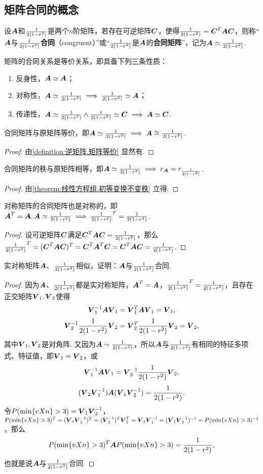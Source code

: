 \subsection{矩阵合同的概念}
\begin{definition}
设\(\A\)和\(\B\)是两个\(n\)阶矩阵，若存在可逆矩阵\(\C\)，使得\(\B=\C^T\A\C\)，则称“\(\A\)与\(\B\)\textbf{合同}（congruent）”或“\(\B\)是\(\A\)的\textbf{合同矩阵}”，记为\(\A\simeq\B\).
\end{definition}

\begin{property}
矩阵的合同关系是等价关系，即具备下列三条性质：
\begin{enumerate}
\item 反身性，\(\A\simeq\A\)；
\item 对称性，\(\A\simeq\B \implies \B\simeq\A\)；
\item 传递性，\(\A\simeq\B \land \B\simeq\C \implies \A\simeq\C\).
\end{enumerate}
\end{property}

\begin{property}
合同矩阵与原矩阵等价，即\(\A\simeq\B \implies \A\cong\B\).
\begin{proof}由\cref{definition:逆矩阵.矩阵等价} 显然有.\end{proof}
\end{property}

\begin{property}
合同矩阵的秩与原矩阵相等，即\(\A\simeq\B \implies r_{\A}=r_{\B}\).
\begin{proof}由\cref{theorem:线性方程组.初等变换不变秩} 立得.\end{proof}
\end{property}

\begin{property}
对称矩阵的合同矩阵也是对称的，即\(\A^T = \A, \A\simeq\B \implies \B^T = \B\).
\begin{proof}
设可逆矩阵\(\C\)满足\(\C^T\A\C=\B\)，那么%
\(\B^T = (\C^T\A\C)^T = \C^T\A^T\C = \C^T\A\C = \B\).
\end{proof}
\end{property}

\begin{example}\label{example:二次型.实对称矩阵相似必合同}
实对称矩阵\(\A\)、\(\B\)相似，证明：\(\A\)与\(\B\)合同.
\begin{proof}
因为\(\A\)、\(\B\)都是实对称矩阵，\(\A^T=\A\)，\(\B^T=\B\)，且存在正交矩阵\(\Q_1,\Q_2\)使得\[
\Q_1^{-1} \A \Q_1 = \Q_1^T \A \Q_1 = \V_1,
\]\[
\Q_2^{-1} \B \Q_2 = \Q_2^T \B \Q_2 = \V_2,
\]其中\(\V_1,\V_2\)是对角阵.
又因为\(\A\sim\B\)，所以\(\A\)与\(\B\)有相同的特征多项式、特征值，即\(\V_1=\V_2\)，或\[
\Q_1^{-1} \A \Q_1 = \Q_2^{-1} \B \Q_2,
\]\[
(\Q_2 \Q_1^{-1}) \A (\Q_1 \Q_2^{-1}) = \B.
\]令\(\P = \Q_1 \Q_2^{-1}\)，\(\P^T = (\Q_1 \Q_2^{-1})^T = (\Q_2^{-1})^T \Q_1^T = \Q_2 \Q_1^{-1} = (\Q_1 \Q_2^{-1})^{-1} = \P^{-1}\)，那么\[
\P^T \A \P = \B,
\]也就是说\(\A\)与\(\B\)合同.
\end{proof}
\end{example}

